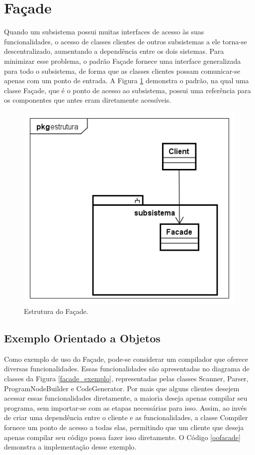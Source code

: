 \section{Façade}

Quando um subsistema possui muitas interfaces 
de acesso às suas funcionalidades, o acesso de 
classes clientes de outros subsistemas a ele 
torna-se descentralizado, aumentando a dependência 
entre os dois sistemas. Para minimizar esse problema, 
o padrão Façade fornece uma interface generalizada 
para todo o subsistema, de forma que as classes 
clientes possam comunicar-se apenas com um ponto 
de entrada. A Figura \ref{facade_struct} demonstra 
o padrão, na qual uma classe Façade, que é o ponto de 
acesso ao subsistema, possui uma referência para 
os componentes que antes eram diretamente acessíveis.\cite{gamma:1995}

\begin{figure}[htb]
	\caption{\label{facade_struct}Estrutura do Façade.}
	\begin{center}
	    \includegraphics[scale=0.4]{5_padroes-contexto-funcional/5.2_estruturais/5.2.5_facade/facade_estrutura.png}
	\end{center}
\end{figure}

\subsection*{Exemplo Orientado a Objetos}

Como exemplo de uso do Façade, pode-se considerar 
um compilador que oferece diversas funcionalidades. 
Essas funcionalidades são apresentadas no diagrama 
de classes da Figura \ref{facade_exemplo}, representadas 
pelas classes Scanner, Parser, ProgramNodeBuilder e 
CodeGenerator. Por mais que alguns clientes desejem 
acessar essas funcionalidades diretamente, a maioria 
deseja apenas compilar seu programa, sem importar-se 
com as etapas necessárias para isso. Assim, ao invés de 
criar uma dependência entre o cliente e as 
funcionalidades, a classe Compiler fornece um ponto 
de acesso a todas elas, permitindo que um cliente 
que deseja apenas compilar seu código possa fazer 
isso diretamente. O Código \ref{oofacade} demonstra 
a implementação desse exemplo.


